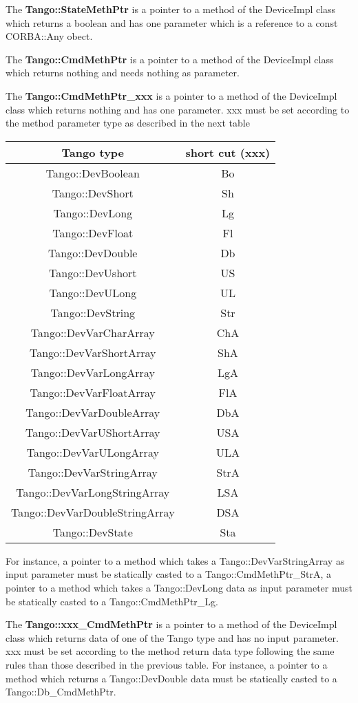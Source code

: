 \vspace{0.3cm}


The \textbf{Tango::StateMethPtr} is a pointer to a method of the DeviceImpl
class which returns a boolean and has one parameter which is a reference
to a const CORBA::Any obect. 

The \textbf{Tango::CmdMethPtr} is a pointer to a method of the DeviceImpl
class which returns nothing and needs nothing as parameter.

The \textbf{Tango::CmdMethPtr\_xxx} is a pointer to a method of the
DeviceImpl class which returns nothing and has one parameter. xxx
must be set according to the method parameter type as described in
the next table

\vspace{0.3cm}


\begin{center}
\begin{longtable}{|c|c|}
\hline 
Tango type & short cut (xxx)\tabularnewline
\hline 
\hline 
Tango::DevBoolean & Bo\tabularnewline
\hline 
Tango::DevShort & Sh\tabularnewline
\hline 
Tango::DevLong & Lg\tabularnewline
\hline 
Tango::DevFloat & Fl\tabularnewline
\hline 
Tango::DevDouble & Db\tabularnewline
\hline 
Tango::DevUshort & US\tabularnewline
\hline 
Tango::DevULong & UL\tabularnewline
\hline 
Tango::DevString & Str\tabularnewline
\hline 
Tango::DevVarCharArray & ChA\tabularnewline
\hline 
Tango::DevVarShortArray & ShA\tabularnewline
\hline 
Tango::DevVarLongArray & LgA\tabularnewline
\hline 
Tango::DevVarFloatArray & FlA\tabularnewline
\hline 
Tango::DevVarDoubleArray & DbA\tabularnewline
\hline 
Tango::DevVarUShortArray & USA\tabularnewline
\hline 
Tango::DevVarULongArray & ULA\tabularnewline
\hline 
Tango::DevVarStringArray & StrA\tabularnewline
\hline 
Tango::DevVarLongStringArray & LSA\tabularnewline
\hline 
Tango::DevVarDoubleStringArray & DSA\tabularnewline
\hline 
Tango::DevState & Sta\tabularnewline
\hline 
\end{longtable}
\par\end{center}

\vspace{0.3cm}


For instance, a pointer to a method which takes a Tango::DevVarStringArray
as input parameter must be statically casted to a Tango::CmdMethPtr\_StrA,
a pointer to a method which takes a Tango::DevLong data as input parameter
must be statically casted to a Tango::CmdMethPtr\_Lg.

The \textbf{Tango::xxx\_CmdMethPtr} is a pointer to a method of the
DeviceImpl class which returns data of one of the Tango type and has
no input parameter. xxx must be set according to the method return
data type following the same rules than those described in the previous
table. For instance, a pointer to a method which returns a Tango::DevDouble
data must be statically casted to a Tango::Db\_CmdMethPtr.

